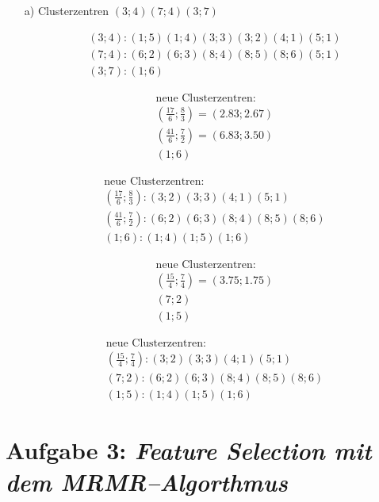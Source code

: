 \begin{itemize}
\item[a)] Clusterzentren $(3;4) (7;4) (3;7)$

\begin{align*}
(3;4): (1;5) (1;4) (3;3) (3;2) (4;1) (5;1)\\
(7;4): (6;2) (6;3) (8;4) (8;5) (8;6) (5;1)\\
(3;7): (1;6)
\end{align*}

\begin{align*}
\text{neue Clusterzentren:}\\
(\frac{17}{6}; \frac{8}{3} ) = (2.83; 2.67)\\
(\frac{41}{6}; \frac{7}{2} ) = (6.83; 3.50)\\
(1; 6 )
\end{align*}


\begin{align*}
\text{neue Clusterzentren:}\\
(\frac{17}{6}; \frac{8}{3} ):(3;2) (3;3) (4;1) (5;1) \\
(\frac{41}{6}; \frac{7}{2} ): (6;2) (6;3) (8;4) (8;5) (8;6) \\
(1; 6 ): (1;4) (1;5) (1;6) 
\end{align*}


\begin{align*}
\text{neue Clusterzentren:}\\
(\frac{15}{4}; \frac{7}{4} ) = (3.75; 1.75)\\
 (7; 2)\\
(1; 5 )
\end{align*}


\begin{align*}
\text{neue Clusterzentren:}\\
(\frac{15}{4}; \frac{7}{4} ):(3;2) (3;3) (4;1) (5;1) \\
 (7; 2): (6;2) (6;3) (8;4) (8;5) (8;6) \\
(1; 5 ): (1;4) (1;5) (1;6) 
\end{align*}

\end{itemize}
\section*{Aufgabe 3: \emph{Feature Selection mit dem MRMR--Algorthmus}}
